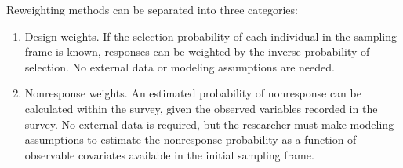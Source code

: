 \documentclass[a4paper,12pt]{article}
\theoremstyle{proposition}
\begin{document}
Reweighting methods can be separated into three categories:

\begin{enumerate}
\item Design weights. If the selection probability of each individual in the sampling frame is known, responses can be weighted by the inverse probability of selection. No external data or modeling assumptions are needed.

\item Nonresponse weights. An estimated probability of nonresponse can be calculated within the survey, given the observed variables recorded in the survey. No external data is required, but the researcher must make modeling assumptions to estimate the nonresponse probability as a function of observable covariates available in the initial sampling frame.


\end{enumerate}
\end{document}
